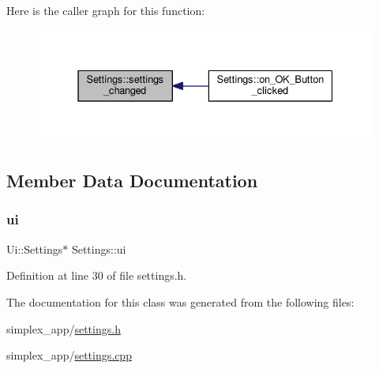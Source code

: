 Here is the caller graph for this function\+:\nopagebreak
\begin{figure}[H]
\begin{center}
\leavevmode
\includegraphics[width=331pt]{classSettings_addd8f1efb702a387115ec3523e462e13_icgraph}
\end{center}
\end{figure}


\subsection{Member Data Documentation}
\mbox{\label{classSettings_a98680be421d0ae7c34a57f2a159eacd4}} 
\subsubsection{\texorpdfstring{ui}{ui}}
{\footnotesize\ttfamily Ui\+::\+Settings$\ast$ Settings\+::ui\hspace{0.3cm}{\ttfamily [private]}}



Definition at line 30 of file settings.\+h.



The documentation for this class was generated from the following files\+:\begin{DoxyCompactItemize}
\item 
simplex\+\_\+app/\hyperlink{settings_8h}{settings.\+h}\item 
simplex\+\_\+app/\hyperlink{settings_8cpp}{settings.\+cpp}\end{DoxyCompactItemize}
